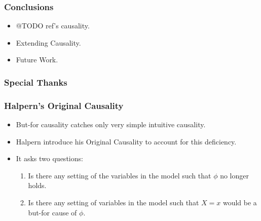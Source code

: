 \documentclass{beamer}
\theoremstyle{plain}
\theoremstyle{definition}
\begin{document}
\begin{frame}
\frametitle{Conclusions}
\begin{itemize}
\item @TODO ref's causality.
\item Extending Causality.
\item Future Work.
\end{itemize}

\end{frame}

\begin{frame}
\frametitle{Special Thanks}

\end{frame}


























\begin{frame}
\frametitle{Halpern's Original Causality}
\begin{itemize}
\item But-for causality catches only very simple intuitive causality.
\item Halpern introduce his Original Causality to account for this deficiency.
\item It asks two questions:
\begin{enumerate}
\item Is there any setting of the variables in the model such that $\phi$ no longer holds.
\item Is there any setting of variables in the model such that $X=x$ would be a but-for cause of $\phi$.
\end{enumerate}
\end{itemize}

\end{frame}
\end{document}
